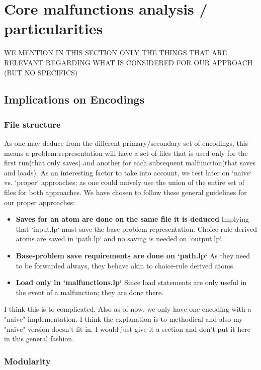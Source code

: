 \section{Core malfunctions analysis / particularities}
\color{red} WE MENTION IN THIS SECTION ONLY THE THINGS THAT ARE  RELEVANT REGARDING WHAT IS CONSIDERED FOR OUR APPROACH (BUT NO SPECIFICS)\color{black}
\subsection{Implications on Encodings}




\subsubsection{File structure}
\color{green}
As one may deduce from the different primary/secondary set of encodings, this means a problem representation will have a set of files that is used only for the first run(that only saves) and another for each subsequent malfunction(that saves and loads). As an interesting factor to take into account, we test later on `naive` vs. `proper` approaches; as one could naively use the union of the entire set of files for both approaches. We have chosen to follow these general guidelines for our proper approaches:
\begin{itemize}
	\item  \textbf{Saves for an atom are done on the same file it is deduced} Implying that `input.lp` must save the base problem representation. Choice-rule derived atoms are saved in `path.lp` and no saving is needed on `output.lp`. 
	\item  \textbf{Base-problem save requirements are done on `path.lp`} As they need to be forwarded always, they behave akin to choice-rule derived atoms.  
	\item  \textbf{Load only in `malfunctions.lp`}  Since load statements are only useful in the event of a malfunction; they are done there. 
\end{itemize}
\color{black} \color{gray} I think this is to complicated. Also as of now, we only have one encoding with a "naive" implementation. I think the explanation is to methodical and also my "naive" version doesn't fit in. I would just give it a section and don't put it here in this general fashion. \color{black}

\color{green}
\subsubsection{Modularity}

